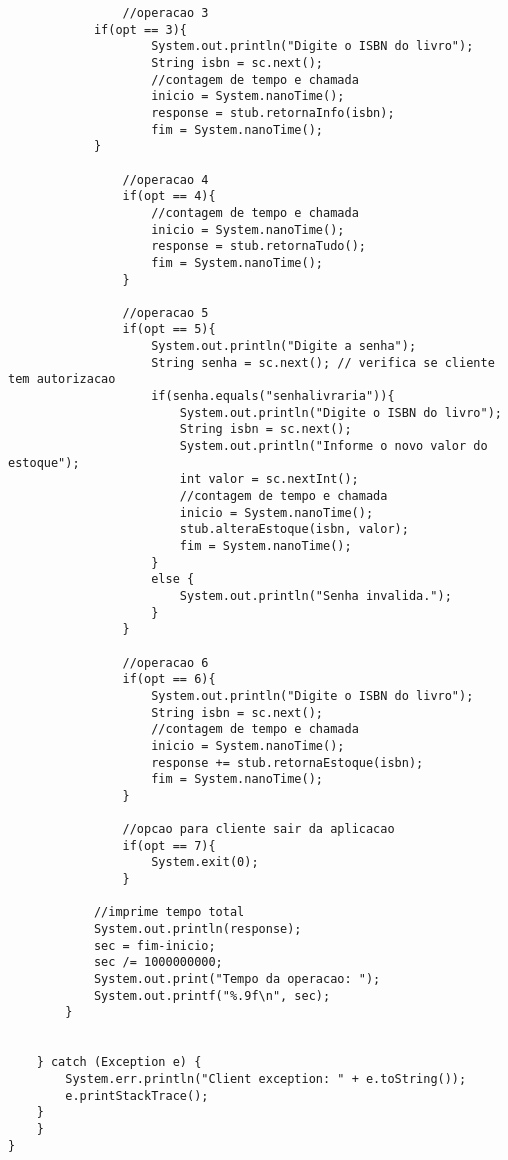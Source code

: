 \documentclass[11pt, brazil]{article} %
\begin{document}
\begin{verbatim}
                //operacao 3
	    	if(opt == 3){
                    System.out.println("Digite o ISBN do livro");
                    String isbn = sc.next();
                    //contagem de tempo e chamada
                    inicio = System.nanoTime();
                    response = stub.retornaInfo(isbn);
                    fim = System.nanoTime();
	    	}
                
                //operacao 4
                if(opt == 4){
                    //contagem de tempo e chamada
                    inicio = System.nanoTime();
                    response = stub.retornaTudo();
                    fim = System.nanoTime();
                }
                
                //operacao 5
                if(opt == 5){
                    System.out.println("Digite a senha");
                    String senha = sc.next(); // verifica se cliente tem autorizacao
                    if(senha.equals("senhalivraria")){
                        System.out.println("Digite o ISBN do livro");
                        String isbn = sc.next();
                        System.out.println("Informe o novo valor do estoque");
                        int valor = sc.nextInt();
                        //contagem de tempo e chamada
                        inicio = System.nanoTime();
                        stub.alteraEstoque(isbn, valor);
                        fim = System.nanoTime();
                    }
                    else {
                        System.out.println("Senha invalida.");
                    }
                }
                 
                //operacao 6
                if(opt == 6){
                    System.out.println("Digite o ISBN do livro");
                    String isbn = sc.next();
                    //contagem de tempo e chamada
                    inicio = System.nanoTime();
                    response += stub.retornaEstoque(isbn);
                    fim = System.nanoTime();
                }

                //opcao para cliente sair da aplicacao
                if(opt == 7){
                    System.exit(0);
                }

	    	//imprime tempo total
	    	System.out.println(response);
	    	sec = fim-inicio;
	    	sec /= 1000000000;
	    	System.out.print("Tempo da operacao: ");
	    	System.out.printf("%.9f\n", sec);
	    }
            
	    
	} catch (Exception e) {
	    System.err.println("Client exception: " + e.toString());
	    e.printStackTrace();
	}
    }
}
\end{verbatim}
\end{document}
